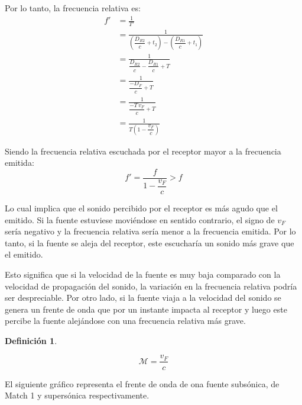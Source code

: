\documentclass[a5paper,12pt,twoside]{book}
\newtheorem{defn}{{Definición}}[chapter]
\begin{document}
Por lo tanto, la frecuencia relativa es:
\begin{align*}
    f' &= \frac{1}{T'}
    \\
    &= \frac{1}{\left( \dfrac{D_{R2}}{c}+t_2 \right) - \left( \dfrac{D_{R1}}{c}+t_1 \right)}
    \\
    &= \frac{1}{\dfrac{D_{R2}}{c} - \dfrac{D_{R1}}{c} + T}
    \\
    &= \frac{1}{\dfrac{-D_F}{c} + T}
    \\
    &= \frac{1}{\dfrac{-T \, v_F}{c} + T}
    \\
    &= \frac{1}{T\left(1-\dfrac{v_F}{c}\right)}
\end{align*}

Siendo la frecuencia relativa escuchada por el receptor mayor a la frecuencia emitida:
\begin{equation*}
    f' = \frac{f}{1-\dfrac{v_F}{c}} > f
\end{equation*}

Lo cual implica que el sonido percibido por el receptor es más agudo que el emitido. Si la fuente estuviese moviéndose en sentido contrario, el signo de $v_F$ sería negativo y la frecuencia relativa sería menor a la frecuencia emitida. Por lo tanto, si la fuente se aleja del receptor, este escucharía un sonido más grave que el emitido.

Esto significa que si la velocidad de la fuente es muy baja comparado con la velocidad de propagación del sonido, la variación en la frecuencia relativa podría ser despreciable. Por otro lado, si la fuente viaja a la velocidad del sonido se genera un frente de onda que por un instante impacta al receptor y luego este percibe la fuente alejándose con una frecuencia relativa más grave.

\begin{mdframed}[style=MyFrame1]
    \begin{defn}
    \end{defn}
    \begin{equation*}
        \mathcal{M} = \frac{v_F}{c}
    \end{equation*}
\end{mdframed}

El siguiente gráfico representa el frente de onda de ona fuente subsónica, de Match 1 y supersónica respectivamente.
\end{document}
